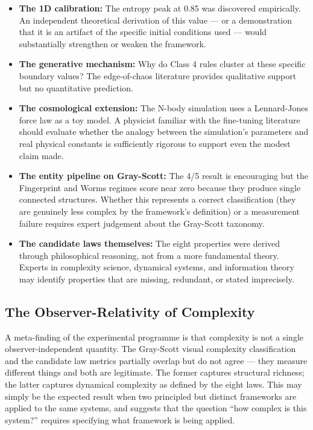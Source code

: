 \documentclass[12pt,a4paper]{article}
\begin{document}
\begin{itemize}[noitemsep]
  \item \textbf{The 1D calibration:} The entropy peak at 0.85 was
    discovered empirically. An independent theoretical derivation of
    this value — or a demonstration that it is an artifact of the
    specific initial conditions used — would substantially strengthen
    or weaken the framework.
  \item \textbf{The generative mechanism:} Why do Class 4 rules cluster
    at these specific boundary values? The edge-of-chaos literature
    \citep{langton1990} provides qualitative support but no quantitative
    prediction.
  \item \textbf{The cosmological extension:} The N-body simulation uses
    a Lennard-Jones force law as a toy model. A physicist familiar with
    the fine-tuning literature should evaluate whether the analogy between
    the simulation's parameters and real physical constants is sufficiently
    rigorous to support even the modest claim made.
  \item \textbf{The entity pipeline on Gray-Scott:} The 4/5 result is
    encouraging but the Fingerprint and Worms regimes score near zero
    because they produce single connected structures. Whether this
    represents a correct classification (they are genuinely less complex
    by the framework's definition) or a measurement failure requires
    expert judgement about the Gray-Scott taxonomy.
  \item \textbf{The candidate laws themselves:} The eight properties were
    derived through philosophical reasoning, not from a more fundamental
    theory. Experts in complexity science, dynamical systems, and
    information theory may identify properties that are missing,
    redundant, or stated imprecisely.
\end{itemize}

\subsection{The Observer-Relativity of Complexity}

A meta-finding of the experimental programme is that complexity is not
a single observer-independent quantity.
The Gray-Scott visual complexity classification and the candidate law
metrics partially overlap but do not agree — they measure different
things and both are legitimate.
The former captures structural richness; the latter captures dynamical
complexity as defined by the eight laws.
This may simply be the expected result when two principled but distinct
frameworks are applied to the same systems, and suggests that the
question ``how complex is this system?'' requires specifying what
framework is being applied.
\end{document}
